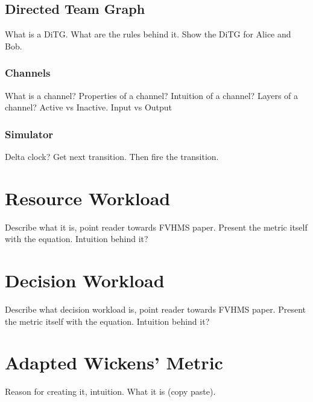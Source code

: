 \subsection{Directed Team Graph}
What is a DiTG.  What are the rules behind it.  Show the DiTG for Alice and Bob.

\subsubsection{Channels}
What is a channel?  Properties of a channel?  Intuition of a channel?  Layers of a channel?  Active vs Inactive.  Input vs Output

\subsubsection{Simulator}
Delta clock?  Get next transition.  Then fire the transition.

\section{Resource Workload}
Describe what it is, point reader towards FVHMS paper.  Present the metric itself with the equation.
Intuition behind it?

\section{Decision Workload}
Describe what decision workload is, point reader towards FVHMS paper.  Present the metric itself with the equation.
Intuition behind it?

\section{Adapted Wickens' Metric}
Reason for creating it, intuition.  What it is (copy paste).